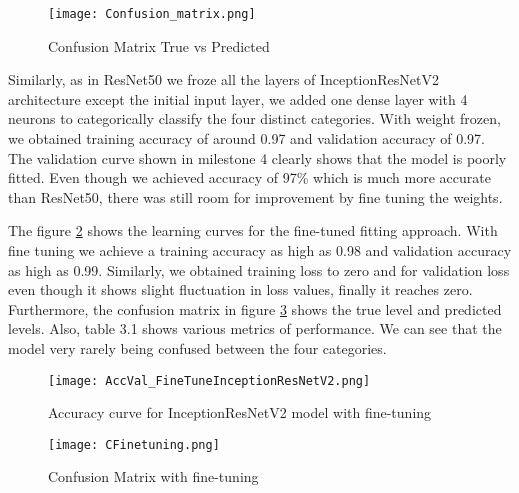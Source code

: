 \documentclass{report}
\begin{document}
 
 \begin{figure}[H]
\centering
\texttt{[image: Confusion\_matrix.png]}
\caption{Confusion Matrix True vs Predicted}
\label{fig:CM}
\end{figure}

Similarly, as in ResNet50 we froze all the layers of InceptionResNetV2 architecture except the initial input layer, we added one dense layer with 4 neurons to categorically classify the four distinct categories. With weight frozen, we obtained training accuracy of around 0.97 and validation accuracy of 0.97. The validation curve shown in milestone 4 clearly shows that the model is poorly fitted. Even though we achieved accuracy of 97\% which is much more accurate than ResNet50, there was still room for improvement by fine tuning the weights. 

The figure \ref{fig:Unfroozen1-66} shows the learning curves for the fine-tuned fitting approach. With fine tuning we achieve a training accuracy as high as 0.98 and validation accuracy as high as 0.99. Similarly, we obtained training loss to zero and for validation loss even though it shows slight fluctuation in loss values, finally it reaches zero. Furthermore, the confusion matrix in figure \ref{fig:CM-66} shows the true level and predicted levels. Also, table 3.1 shows various metrics of performance. We can see that the model very rarely being confused between the four categories.

\begin{figure}[H]
\centering
\texttt{[image: AccVal\_FineTuneInceptionResNetV2.png]}
\caption{Accuracy curve for InceptionResNetV2 model with fine-tuning}
\label{fig:Unfroozen1-66}
\end{figure}

\begin{figure}[H]
\centering
\texttt{[image: CFinetuning.png]}
\caption{Confusion Matrix with fine-tuning}
\label{fig:CM-66}
\end{figure}

\hfill
\end{document}
